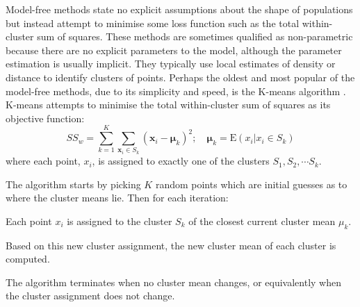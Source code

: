 Model-free methods state no explicit assumptions about the shape of populations but instead
attempt to minimise some loss function such as the total within-cluster sum of squares.
These methods are sometimes qualified as non-parametric because there are no explicit parameters to the model,
although the parameter estimation is usually implicit.
They typically use local estimates of density or distance to identify clusters of points.
Perhaps the oldest and most popular of the model-free methods, due to its simplicity and speed, is the K-means algorithm \citep{MacQueen:1967uv}.
K-means attempts to minimise the total within-cluster sum of squares as its objective function:
\begin{equation}
\label{equation:ssw}
SS_{w} = \sum_{k=1}^{K} \sum_{\mathbf x_i \in S_k} ( \mathbf x_i - \boldsymbol\mu_k )^2 ; \quad \boldsymbol\mu_k=\text{E}(x_i| x_i \in S_k)
\end{equation}
where each point, $x_i$, is assigned to exactly one of the clusters $S_1, S_2, \cdots S_k$.

The algorithm starts by picking $K$ random points which are initial guesses as to where the cluster means lie.
Then for each iteration:
\begin{itemise}
    \item Each point $x_i$ is assigned to the cluster $S_k$ of the closest current cluster mean $\mu_k$.
    \item Based on this new cluster assignment, the new cluster mean of each cluster is computed.
\end{itemise}
The algorithm terminates when no cluster mean changes, or equivalently when the cluster assignment does not change.


